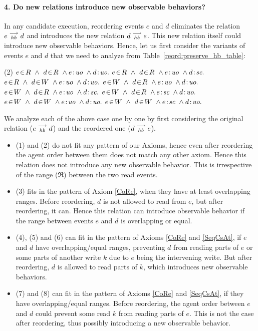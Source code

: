 
\paragraph{4. Do new relations introduce new observable behaviors?}
    In any candidate execution, reordering events $e$ and $d$ eliminates the relation $e\stackrel{\longrightarrow}{_{hb}}d$ and introduces the new relation $d\stackrel{\longrightarrow}{_{hb}}e$.
    This new relation itself could introduce new observable behaviors.  
    Hence, let us first consider the variants of events $e$ and $d$ that we need to analyze from Table~\ref{reord:preserve_hb_table}:
    \begin{tasks}[style=enumerate](2)
        \task $\event{e}{R} \ \wedge \ \event{d}{R} \ \wedge \et{e}{uo} \ \wedge \et{d}{uo}.$
        \task $\event{e}{R} \ \wedge \ \event{d}{R} \ \wedge \et{e}{uo} \ \wedge \et{d}{sc}.$
        \task $\event{e}{R} \ \wedge \ \event{d}{W} \ \wedge \et{e}{uo} \ \wedge \et{d}{uo}.$
        \task $\event{e}{W} \ \wedge \ \event{d}{R} \ \wedge \et{e}{uo} \ \wedge \et{d}{uo}.$
        \task $\event{e}{W} \ \wedge \ \event{d}{R} \ \wedge \et{e}{uo} \ \wedge \et{d}{sc}.$
        \task $\event{e}{W} \ \wedge \ \event{d}{R} \ \wedge \et{e}{sc} \ \wedge \et{d}{uo}.$
        \task $\event{e}{W} \ \wedge \ \event{d}{W} \ \wedge \et{e}{uo} \ \wedge \et{d}{uo}.$
        \task $\event{e}{W} \ \wedge \ \event{d}{W} \ \wedge \et{e}{sc} \ \wedge \et{d}{uo}.$
    \end{tasks}

    We analyze each of the above case one by one by first considering the original relation ($e\stackrel{\longrightarrow}{_{hb}}d$) and the reordered one ($d\stackrel{\longrightarrow}{_{hb}}e$). 
    \begin{itemize}
        \item (1) and (2) do not fit any pattern of our Axioms, hence even after reordering the agent order between them does not match any other axiom. Hence this relation does not introduce any new observable behavior. This is irrespective of the range ($\Re$) between the two read events.
        \item (3) fits in the pattern of Axiom \ref{CoRe}, when they have at least overlapping ranges. Before reordering, $d$ is not allowed to read from $e$, but after reordering, it can. Hence this relation can introduce observable behavior if the range between events $e$ and $d$ is overlapping or equal. 
        \item (4), (5) and (6) can fit in the pattern of Axioms \ref{CoRe} and \ref{SeqCsAt}, if $e$ and $d$ have overlapping/equal ranges, preventing $d$ from reading parts of $e$ or some parts of another write $k$ due to $e$ being the intervening write. But after reordering, $d$ is allowed to read parts of $k$, which introduces new observable behaviors.
        \item (7) and (8) can fit in the pattern of Axioms \ref{CoRe} and \ref{SeqCsAt}, if they have overlapping/equal ranges. Before reordering, the agent order between $e$ and $d$ could prevent some read $k$ from reading parts of $e$. This is not the case after reordering, thus possibly introducing a new observable behavior. 
    \end{itemize}

